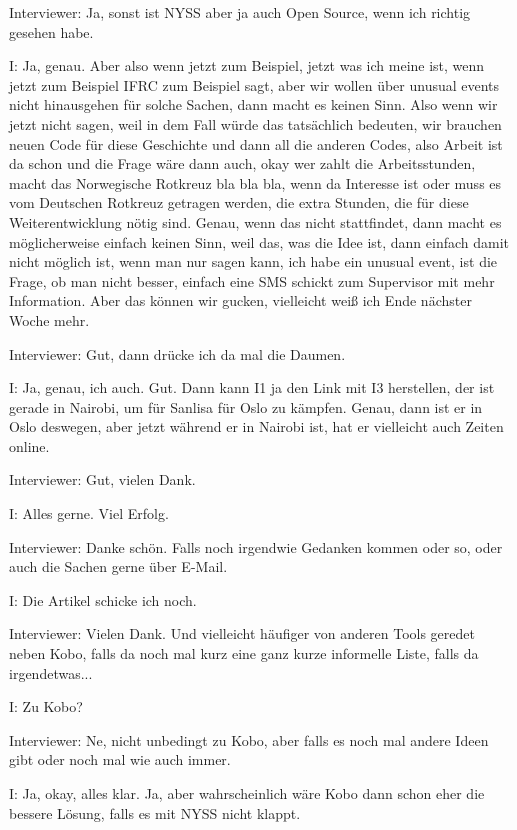 Interviewer: Ja, sonst ist NYSS aber ja auch Open Source, wenn ich richtig gesehen habe.

I: Ja, genau. Aber also wenn jetzt zum Beispiel, jetzt was ich meine ist, wenn jetzt zum Beispiel IFRC zum Beispiel sagt, aber wir wollen {\"u}ber unusual events nicht hinausgehen f{\"u}r solche Sachen, dann macht es keinen Sinn. Also wenn wir jetzt nicht sagen, weil in dem Fall w{\"u}rde das tats{\"a}chlich bedeuten, wir brauchen neuen Code f{\"u}r diese Geschichte und dann all die anderen Codes, also Arbeit ist da schon und die Frage w{\"a}re dann auch, okay wer zahlt die Arbeitsstunden, macht das Norwegische Rotkreuz bla bla bla, wenn da Interesse ist oder muss es vom Deutschen Rotkreuz getragen werden, die extra Stunden, die f{\"u}r diese Weiterentwicklung n{\"o}tig sind. Genau, wenn das nicht stattfindet, dann macht es m{\"o}glicherweise einfach keinen Sinn, weil das, was die Idee ist, dann einfach damit nicht m{\"o}glich ist, wenn man nur sagen kann, ich habe ein unusual event, ist die Frage, ob man nicht besser, einfach eine SMS schickt zum Supervisor mit mehr Information. Aber das k{\"o}nnen wir gucken, vielleicht weiß ich  Ende n{\"a}chster Woche mehr. 

Interviewer: Gut, dann dr{\"u}cke ich da mal die Daumen. 

I: Ja, genau, ich auch. Gut. Dann kann I1 ja den Link mit I3 herstellen, der ist gerade in Nairobi, um f{\"u}r Sanlisa f{\"u}r Oslo zu k{\"a}mpfen. Genau, dann ist er in Oslo deswegen, aber jetzt w{\"a}hrend er in Nairobi ist, hat er vielleicht auch Zeiten online. 

Interviewer: Gut, vielen Dank. 

I: Alles gerne. Viel Erfolg. 

Interviewer: Danke sch{\"o}n. Falls noch irgendwie Gedanken kommen oder so, oder auch die Sachen gerne {\"u}ber E-Mail. 

I: Die Artikel schicke ich noch. 

Interviewer: Vielen Dank. Und vielleicht h{\"a}ufiger von anderen Tools geredet neben Kobo, falls da noch mal kurz eine ganz kurze informelle Liste, falls da irgendetwas... 

I: Zu Kobo? 

Interviewer: Ne, nicht unbedingt zu Kobo, aber falls es noch mal andere Ideen gibt oder noch mal wie auch immer. 

I: Ja, okay, alles klar. Ja, aber wahrscheinlich w{\"a}re Kobo dann schon eher die bessere L{\"o}sung, falls es mit NYSS nicht klappt. 

